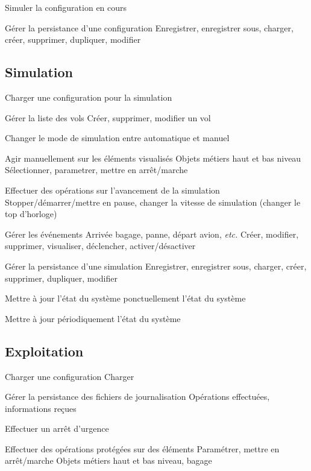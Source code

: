 \nBesoin
{Simuler la configuration en cours}
{}
{}

\nBesoin
{Gérer la persistance d'une configuration}
{}
{Enregistrer, enregistrer sous, charger, créer, supprimer, dupliquer, modifier}

\subsection{Simulation}
\setcounter{cntBesoins}{1}

\nBesoin
{Charger une configuration pour la simulation}
{}
{}

\nBesoin
{Gérer la liste des vols}
{}
{Créer, supprimer, modifier un vol}

\nBesoin
{Changer le mode de simulation entre automatique et manuel}
{}
{}

\nBesoin
{Agir manuellement sur les éléments visualisés}
{Objets métiers haut et bas niveau}
{Sélectionner, parametrer, mettre en arrêt/marche}

\nBesoin
{Effectuer des opérations sur l'avancement de la simulation}
{}
{Stopper/démarrer/mettre en pause, changer la vitesse de simulation (changer le top d'horloge)}

\nBesoin
{Gérer les événements}
{Arrivée bagage, panne, départ avion, \textsl{etc.}}
{Créer, modifier, supprimer, visualiser, déclencher, activer/désactiver}

\nBesoin
{Gérer la persistance d'une simulation}
{}
{Enregistrer, enregistrer sous, charger, créer, supprimer, dupliquer, modifier}

\nBesoin
{Mettre à jour l'état du système ponctuellement l'état du système}
{}
{}

{}
{}

\nBesoin
{Mettre à jour périodiquement l'état du système}
{}
{}

\subsection{Exploitation}
\setcounter{cntBesoins}{1}

\nBesoin
{Charger une configuration}
{}
{Charger}

\nBesoin
{Gérer la persistance des fichiers de journalisation}
{Opérations effectuées, informations reçues}
{}

\nBesoin
{Effectuer un arrêt d'urgence}
{}{}

\nBesoin
{Effectuer des opérations protégées sur des éléments}
{Paramétrer, mettre en arrêt/marche}
{Objets métiers haut et bas niveau, bagage}

